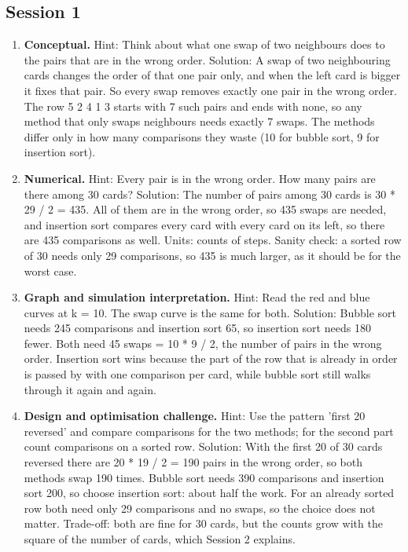 \documentclass[11pt,a4paper]{article}
\begin{document}
\subsection*{Session 1}
\begin{enumerate}[nosep]
\item \textbf{Conceptual.} Hint: Think about what one swap of two neighbours does to the pairs that are in the wrong order. Solution: A swap of two neighbouring cards changes the order of that one pair only, and when the left card is bigger it fixes that pair. So every swap removes exactly one pair in the wrong order. The row 5 2 4 1 3 starts with 7 such pairs and ends with none, so any method that only swaps neighbours needs exactly 7 swaps. The methods differ only in how many comparisons they waste (10 for bubble sort, 9 for insertion sort).
\item \textbf{Numerical.} Hint: Every pair is in the wrong order. How many pairs are there among 30 cards? Solution: The number of pairs among 30 cards is 30 * 29 / 2 = 435. All of them are in the wrong order, so 435 swaps are needed, and insertion sort compares every card with every card on its left, so there are 435 comparisons as well. Units: counts of steps. Sanity check: a sorted row of 30 needs only 29 comparisons, so 435 is much larger, as it should be for the worst case.
\item \textbf{Graph and simulation interpretation.} Hint: Read the red and blue curves at k = 10. The swap curve is the same for both. Solution: Bubble sort needs 245 comparisons and insertion sort 65, so insertion sort needs 180 fewer. Both need 45 swaps = 10 * 9 / 2, the number of pairs in the wrong order. Insertion sort wins because the part of the row that is already in order is passed by with one comparison per card, while bubble sort still walks through it again and again.
\item \textbf{Design and optimisation challenge.} Hint: Use the pattern 'first 20 reversed' and compare comparisons for the two methods; for the second part count comparisons on a sorted row. Solution: With the first 20 of 30 cards reversed there are 20 * 19 / 2 = 190 pairs in the wrong order, so both methods swap 190 times. Bubble sort needs 390 comparisons and insertion sort 200, so choose insertion sort: about half the work. For an already sorted row both need only 29 comparisons and no swaps, so the choice does not matter. Trade-off: both are fine for 30 cards, but the counts grow with the square of the number of cards, which Session 2 explains.
\end{enumerate}
\end{document}
